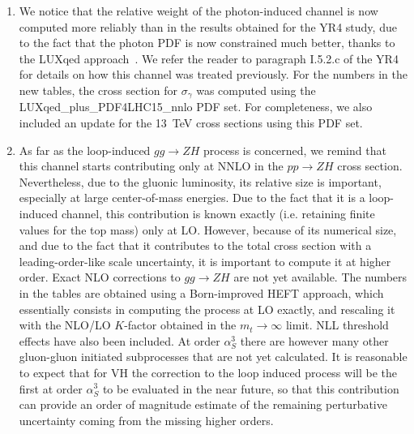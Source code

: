 \begin{enumerate}
\item We notice that the relative weight of the photon-induced channel is
now computed more reliably than in the results obtained for the YR4
study, due to the fact that the photon PDF is now constrained much
better, thanks to the LUXqed approach~\cite{Manohar:2016nzj,Manohar:2017eqh}. We
refer the reader to paragraph I.5.2.c of the YR4 for details on how
this channel was treated previously. For the numbers in the new
tables, the cross section for $\sigma_\gamma$ was computed using the
LUXqed\_plus\_PDF4LHC15\_nnlo PDF set. For completeness, we also included
an update for the 13~TeV cross sections using this PDF set.


\item As far as the loop-induced $gg\rightarrow ZH$ process is concerned, we remind
that this channel starts contributing only at NNLO in the $pp \rightarrow ZH$ cross
section. Nevertheless, due to the gluonic luminosity, its relative
size is important, especially at large center-of-mass energies.
%
Due to the fact that it is a loop-induced channel, this contribution
is known exactly (i.e. retaining finite values for the top mass) only at
LO.  However, because of its numerical size, and due to the fact that
it contributes to the total cross section with a leading-order-like
scale uncertainty, it is important to compute it at higher order.
%
Exact NLO corrections to $gg \rightarrow ZH$ are not yet available. The numbers in
the tables are obtained using a Born-improved HEFT approach, which
essentially consists in computing the process at LO exactly, and
rescaling it with the NLO/LO $K$-factor obtained in the
$m_t\to\infty$ limit. NLL threshold effects have also been
included.
At order $\alpha_S^3$ there are however many other gluon-gluon initiated subprocesses
that are not yet calculated. It is reasonable
to expect that for VH the correction to the loop induced process will be the
first at order $\alpha_S^3$ to be evaluated in the near future, so that this contribution can provide an order of magnitude estimate of the remaining
perturbative uncertainty
coming from the missing higher orders.
\end{enumerate}



